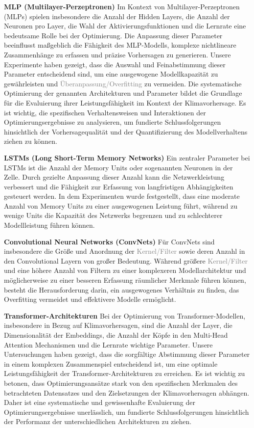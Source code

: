 \documentclass[manuscript,screen,review]{acmart}
\begin{document}
\textbf{MLP (Multilayer-Perzeptronen)}
Im Kontext von Multilayer-Perzeptronen (MLPs) spielen insbesondere die Anzahl der Hidden Layers, die Anzahl der Neuronen pro Layer, 
die Wahl der Aktivierungsfunktionen und die Lernrate eine bedeutsame Rolle bei der Optimierung. 
Die Anpassung dieser Parameter beeinflusst maßgeblich die Fähigkeit des MLP-Modells, komplexe nichtlineare Zusammenhänge zu erfassen und präzise Vorhersagen zu generieren. 
Unsere Experimente haben gezeigt, dass die Auswahl und Feinabstimmung dieser Parameter entscheidend sind, um eine ausgewogene Modellkapazität zu gewährleisten und \textcolor{gray}{Überanpassung/Overfitting} zu vermeiden.
Die systematische Optimierung der genannten Architekturen und Parameter bildet die Grundlage für die Evaluierung ihrer Leistungsfähigkeit im Kontext der Klimavorhersage. 
Es ist wichtig, die spezifischen Verhaltensweisen und Interaktionen der Optimierungsergebnisse zu analysieren, um fundierte Schlussfolgerungen hinsichtlich der Vorhersagequalität und der Quantifizierung des Modellverhaltens ziehen zu können.

\textbf{LSTMs (Long Short-Term Memory Networks)}
Ein zentraler Parameter bei LSTMs ist die Anzahl der Memory Units oder sogenannten Neuronen in der Zelle. Durch gezielte Anpassung dieser Anzahl kann die Netzwerkleistung verbessert 
und die Fähigkeit zur Erfassung von langfristigen Abhängigkeiten gesteuert werden. 
In dem Experimenten wurde festgestellt, dass eine moderate Anzahl von Memory Units zu einer ausgewogenen Leistung führt, während zu wenige Units die Kapazität des Netzwerks begrenzen und zu schlechterer Modellleistung führen können.

\textbf{Convolutional Neural Networks (ConvNets)}
Für ConvNets sind insbesondere die Größe und Anordnung der \textcolor{gray}{Kernel/Filter} sowie deren Anzahl in den Convolutional Layern von großer Bedeutung. 
Während größere \textcolor{gray}{Kernel/Filter} und eine höhere Anzahl von Filtern zu einer komplexeren Modellarchitektur und möglicherweise zu einer besseren Erfassung räumlicher Merkmale führen können, 
besteht die Herausforderung darin, ein ausgewogenes Verhältnis zu finden, das Overfitting vermeidet und effektivere Modelle ermöglicht.

\textbf{Transformer-Architekturen}
Bei der Optimierung von Transformer-Modellen, insbesondere in Bezug auf Klimavorhersagen, sind die Anzahl der Layer, die Dimensionalität der Embeddings, die Anzahl der Köpfe in den Multi-Head Attention Mechanismen und die Lernrate wichtige Parameter. Unsere Untersuchungen haben gezeigt, dass die sorgfältige Abstimmung dieser Parameter in einem komplexen Zusammenspiel entscheidend ist, um eine optimale Leistungsfähigkeit der Transformer-Architekturen zu erreichen.
Es ist wichtig zu betonen, dass Optimierungsansätze stark von den spezifischen Merkmalen des betrachteten Datensatzes und den Zielsetzungen der Klimavorhersagen abhängen. Daher ist eine systematische und gewissenhafte Evaluierung der Optimierungsergebnisse unerlässlich, um fundierte Schlussfolgerungen hinsichtlich der Performanz der unterschiedlichen Architekturen zu ziehen.
\end{document}
